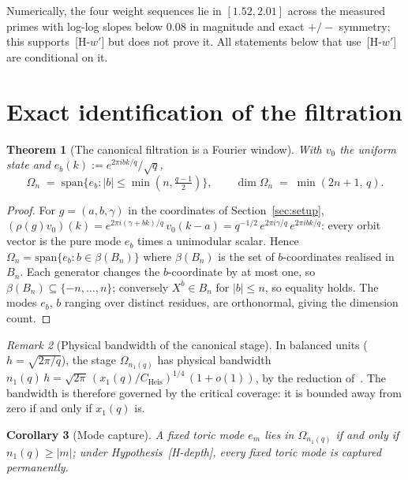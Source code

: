 \documentclass[11pt,a4paper]{article}
\theoremstyle{plain}
\newtheorem{theorem}{Theorem}[section]
\newtheorem{corollary}[theorem]{Corollary}
\theoremstyle{definition}
\theoremstyle{remark}
\newtheorem{remark}[theorem]{Remark}
\newcommand{\CHeis}{C_{\mathrm{Heis}}}
\begin{document}
    Numerically, the four weight sequences lie in $[1.52, 2.01]$ across the measured primes with
    log-log slopes below $0.08$ in magnitude and exact $+/-$ symmetry; this supports~[H-$w'$] but does
    not prove it.
    All statements below that use~[H-$w'$] are conditional on it.

  \section{Exact identification of the filtration}
  \label{sec:filtration}

    \begin{theorem}[The canonical filtration is a Fourier window]
      \label{thm:identification}
      With $v_0$ the uniform state and $e_b(k) := e^{2\pi i b k/q}/\sqrt{q}$,
      \[
        \Omega_n \;=\; \mathrm{span}\bigl\{ e_b : |b| \le \min(n, \tfrac{q-1}{2}) \bigr\},
        \qquad
        \dim \Omega_n \;=\; \min(2n+1,\, q).
      \]
    \end{theorem}

    \begin{proof}
      For $g = (a, b, \gamma)$ in the coordinates of Section~\ref{sec:setup},
      $(\rho(g) v_0)(k) = e^{2\pi i(\gamma + b k)/q}\, v_0(k - a)
      = q^{-1/2}\, e^{2\pi i \gamma/q}\, e^{2\pi i b k/q}$:
      every orbit vector is the pure mode $e_b$ times a unimodular scalar.
      Hence $\Omega_n = \mathrm{span}\{e_b : b \in \beta(B_n)\}$ where $\beta(B_n)$ is the set of
      $b$-coordinates realised in $B_n$.
      Each generator changes the $b$-coordinate by at most one, so
      $\beta(B_n) \subseteq \{-n, \ldots, n\}$; conversely $X^{b} \in B_n$ for $|b| \le n$, so equality
      holds.
      The modes $e_b$, $b$ ranging over distinct residues, are orthonormal, giving the dimension count.
    \end{proof}

    \begin{remark}[Physical bandwidth of the canonical stage]
      \label{rem:bandwidth}
      In balanced units ($h = \sqrt{2\pi/q}$), the stage $\Omega_{n_1(q)}$ has physical bandwidth
      $n_1(q)\,h = \sqrt{2\pi}\,(x_1(q)/\CHeis)^{1/4}\,(1 + o(1))$, by the reduction
      of~\cite{Beau2026ccnote}.
      The bandwidth is therefore governed by the critical coverage: it is bounded away from zero if and
      only if $x_1(q)$ is.
    \end{remark}

    \begin{corollary}[Mode capture]
      \label{cor:capture}
      A fixed toric mode $e_m$ lies in $\Omega_{n_1(q)}$ if and only if
      $n_1(q) \ge |m|$; under Hypothesis~\textup{[H-depth]}, every fixed toric mode is captured
      permanently.
    \end{corollary}
\end{document}
